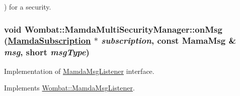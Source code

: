 ) for a security. \hypertarget{classWombat_1_1MamdaMultiSecurityManager_c850052340fb02a8c2485677fdc4cac9}{
\subsubsection[onMsg]{\setlength{\rightskip}{0pt plus 5cm}void Wombat::Mamda\-Multi\-Security\-Manager::on\-Msg (\hyperlink{classWombat_1_1MamdaSubscription}{Mamda\-Subscription} $\ast$ {\em subscription}, const Mama\-Msg \& {\em msg}, short {\em msg\-Type})}}
\label{classWombat_1_1MamdaMultiSecurityManager_c850052340fb02a8c2485677fdc4cac9}


Implementation of \hyperlink{classWombat_1_1MamdaMsgListener}{Mamda\-Msg\-Listener} interface. 



Implements \hyperlink{classWombat_1_1MamdaMsgListener_c700829ebcce095b95b8b67b39a1c67d}{Wombat::Mamda\-Msg\-Listener}.